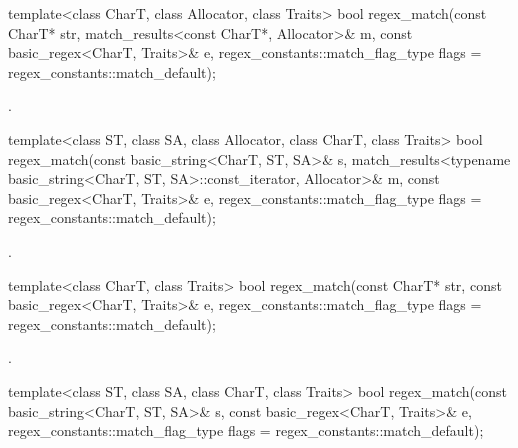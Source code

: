 %
\begin{itemdecl}
template<class CharT, class Allocator, class Traits>
  bool regex_match(const CharT* str,
                   match_results<const CharT*, Allocator>& m,
                   const basic_regex<CharT, Traits>& e,
                   regex_constants::match_flag_type flags = regex_constants::match_default);
\end{itemdecl}

\begin{itemdescr}
\pnum
\returns
{}.
\end{itemdescr}

%
\begin{itemdecl}
template<class ST, class SA, class Allocator, class CharT, class Traits>
  bool regex_match(const basic_string<CharT, ST, SA>& s,
                   match_results<typename basic_string<CharT, ST, SA>::const_iterator,
                                 Allocator>& m,
                   const basic_regex<CharT, Traits>& e,
                   regex_constants::match_flag_type flags = regex_constants::match_default);
\end{itemdecl}

\begin{itemdescr}
\pnum
\returns
{}.
\end{itemdescr}

%
\begin{itemdecl}
template<class CharT, class Traits>
  bool regex_match(const CharT* str,
                   const basic_regex<CharT, Traits>& e,
                   regex_constants::match_flag_type flags = regex_constants::match_default);
\end{itemdecl}

\begin{itemdescr}
\pnum
\returns
{}.
\end{itemdescr}

%
\begin{itemdecl}
template<class ST, class SA, class CharT, class Traits>
  bool regex_match(const basic_string<CharT, ST, SA>& s,
                   const basic_regex<CharT, Traits>& e,
                   regex_constants::match_flag_type flags = regex_constants::match_default);
\end{itemdecl}

